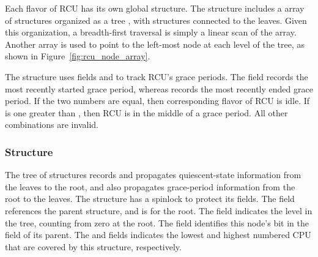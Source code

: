 Each flavor of RCU has its own global  structure. 
The  structure includes
a array of  structures organized as a tree
, with
 structures connected to the leaves.
Given this organization, a breadth-first traversal is 
simply a linear scan of the array.
Another array   
is used to point to the left-most node at each level of the tree,
as shown in Figure~\ref{fig:rcu_node_array}.

The  structure uses  fields 
and  to track RCU's grace periods.
The  field records the most recently started grace period,
whereas  records the most recently ended grace period.
If the two numbers are equal, then corresponding flavor of RCU is idle.
If  is one greater than , then RCU is in the
middle of a grace period.
All other combinations are invalid.


\subsubsection{ Structure}
\label{sec:rcu_node}
The tree of  structures records and 
propagates quiescent-state information from the leaves to the root,
and also propagates grace-period information from the root to the leaves. 
%
The  structure has a spinlock  to protect its fields.
The  field references the parent  structure,
and is  for the root.
The  field indicates the level in the tree, counting from zero
at the root.
The  field identifies this node's bit in the
 field of its parent.
The  and  fields indicates the lowest and highest 
numbered CPU that are covered by this  structure, respectively.

